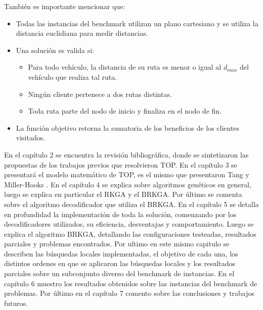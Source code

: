 \begin{minipage}{\textwidth}
También es importante mencionar que:

\begin{itemize}
	\item Todas las instancias del benchmark utilizan un plano cartesiano y se utiliza la distancia euclidiana para medir distancias.
	\item Una solución es valida si:
	\begin{itemize}
		\item Para todo vehículo, la distancia de su ruta es menor o igual al $d_{max}$ del vehículo que realiza tal ruta.
		\item Ningún cliente pertenece a dos rutas distintas.
		\item Toda ruta parte del nodo de inicio y finaliza en el nodo de fin.
	\end{itemize}
	\item La función objetivo retorna la sumatoria de los beneficios de los clientes visitados.
\end{itemize}
\end{minipage}

\bigskip

En el capítulo 2 se encuentra la revisión bibliográfica, donde se sintetizaron las propuestas de los trabajos previos que resolvieron TOP.
En el capítulo 3 se presentará el modelo matemático de TOP, es el mismo que presentaron Tang y Miller-Hooks \cite{TangMillerHooks} .
En el capítulo 4 se explica sobre algoritmos genéticos en general, luego se explica en particular el RKGA y el BRKGA. Por último se comenta sobre el algoritmo decodificador que utiliza el BRKGA.
En el capítulo 5 se detalla en profundidad la implementación de toda la solución, comenzando por los decodificadores utilizados, su eficiencia, desventajas y comportamiento. Luego se explica el algoritmo BRKGA, detallando las configuraciones testeadas, resultados parciales y problemas encontrados. Por ultimo en este mismo capitulo se describen las búsquedas locales implementadas, el objetivo de cada una, los distintos ordenes en que se aplicaron las búsquedas locales y los resultados parciales sobre un subconjunto diverso del benchmark de instancias.
En el capítulo 6 muestro los resultados obtenidos sobre las instancias del benchmark de problemas.
Por último en el capítulo 7 comento sobre las conclusiones y trabajos futuros.


























